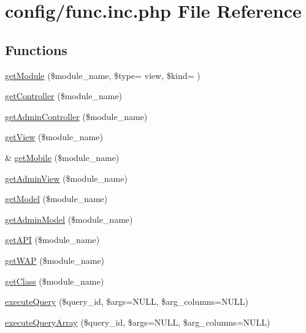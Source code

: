 \hypertarget{func_8inc_8php}{}\section{config/func.inc.\+php File Reference}
\label{func_8inc_8php}
\subsection*{Functions}
\begin{DoxyCompactItemize}
\item 
\hyperlink{func_8inc_8php_ad4f68c32ca6c16b3a8619ac3462dc686}{get\+Module} (\$module\+\_\+name, \$type= \textquotesingle{}view\textquotesingle{}, \$kind= \textquotesingle{}\textquotesingle{})
\item 
\hyperlink{func_8inc_8php_aa08f01e3bf130d770b373ca8493e3e9b}{get\+Controller} (\$module\+\_\+name)
\item 
\hyperlink{func_8inc_8php_a2f7ca88a5226536aca3b2f5682bd7b2d}{get\+Admin\+Controller} (\$module\+\_\+name)
\item 
\hyperlink{func_8inc_8php_a49d537fc2c7b51ab5d7b7c6672b21ce3}{get\+View} (\$module\+\_\+name)
\item 
\& \hyperlink{func_8inc_8php_a26d3f423593da53eb90bb738aeed23ea}{get\+Mobile} (\$module\+\_\+name)
\item 
\hyperlink{func_8inc_8php_a194629ccc05f325c64834925b05d0941}{get\+Admin\+View} (\$module\+\_\+name)
\item 
\hyperlink{func_8inc_8php_aecdfcc5332bcf22df01fc21a03b64435}{get\+Model} (\$module\+\_\+name)
\item 
\hyperlink{func_8inc_8php_a902cd0c884e75afab2682fdd3ae3791f}{get\+Admin\+Model} (\$module\+\_\+name)
\item 
\hyperlink{func_8inc_8php_a12c822fc3e002eb1c58c58001db7ac88}{get\+A\+P\+I} (\$module\+\_\+name)
\item 
\hyperlink{func_8inc_8php_a0d8de97888953b480d02a9c9d845a64c}{get\+W\+A\+P} (\$module\+\_\+name)
\item 
\hyperlink{func_8inc_8php_a1d90f6abc9ca2d1a4500071159ebd4e7}{get\+Class} (\$module\+\_\+name)
\item 
\hyperlink{func_8inc_8php_a418bc23855eebc0d90190dd625ac4474}{execute\+Query} (\$query\+\_\+id, \$args=N\+U\+L\+L, \$arg\+\_\+columns=N\+U\+L\+L)
\item 
\hyperlink{func_8inc_8php_ace5cc06ee6c5d655a1bdcc15846a779e}{execute\+Query\+Array} (\$query\+\_\+id, \$args=N\+U\+L\+L, \$arg\+\_\+columns=N\+U\+L\+L)

\end{DoxyCompactItemize}
